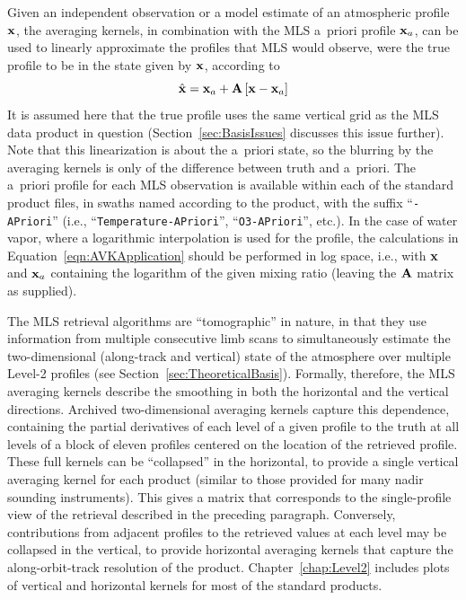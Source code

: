 Given an independent observation or a model estimate of an atmospheric profile $\mathbf{x}$, the averaging kernels, in combination with the MLS a~priori profile $\mathbf{x}_a$, can be used to linearly approximate the profiles that MLS would observe, were the true profile to be in the state given by $\mathbf{x}$, according to
\begin{equation}
  \hat{\mathbf{x}} = \mathbf{x}_a + \mathbf{A}\left[\mathbf{x}-\mathbf{x}_a\right]
  \label{eqn:AVKApplication}
\end{equation}
It is assumed here that the true profile uses the same vertical grid as the MLS data product in question (Section~\ref{sec:BasisIssues} discusses this issue further).  Note that this linearization is about the a~priori state, so the blurring by the averaging kernels is only of the difference between truth and a~priori.  The a~priori profile for each MLS observation is available within each of the standard product files, in swaths named according to the product, with the suffix ``\texttt{-APriori}'' (i.e., ``\texttt{Temperature-APriori}'', ``\texttt{O3-APriori}'', etc.).  In the case of water vapor, where a logarithmic interpolation is used for the profile, the calculations in Equation~\ref{eqn:AVKApplication} should be performed in log space, i.e., with $\mathbf{x}$ and $\mathbf{x}_a$ containing the logarithm of the given  mixing ratio (leaving the $\mathbf{A}$ matrix as supplied).

The MLS retrieval algorithms are ``tomographic'' in nature, in that they use information from multiple consecutive limb scans to simultaneously estimate the two-dimensional (along-track and vertical) state of the atmosphere over multiple \mbox{Level-2} profiles (see Section~\ref{sec:TheoreticalBasis}). Formally, therefore, the MLS averaging kernels describe the smoothing in both the horizontal and the vertical directions. Archived two-dimensional averaging kernels capture this dependence, containing the partial derivatives of each level of a given profile to the truth at all levels of a block of eleven profiles centered on the location of the retrieved profile. These full kernels can be ``collapsed'' in the horizontal, to provide a single vertical averaging kernel for each product (similar to those provided for many nadir sounding instruments). This gives a matrix that corresponds to the single-profile view of the retrieval described in the preceding paragraph. Conversely, contributions from adjacent profiles to the retrieved values at each level may be collapsed in the vertical, to provide horizontal averaging kernels that capture the along-orbit-track resolution of the product. Chapter~\ref{chap:Level2} includes plots of vertical and horizontal kernels for most of the standard products.

